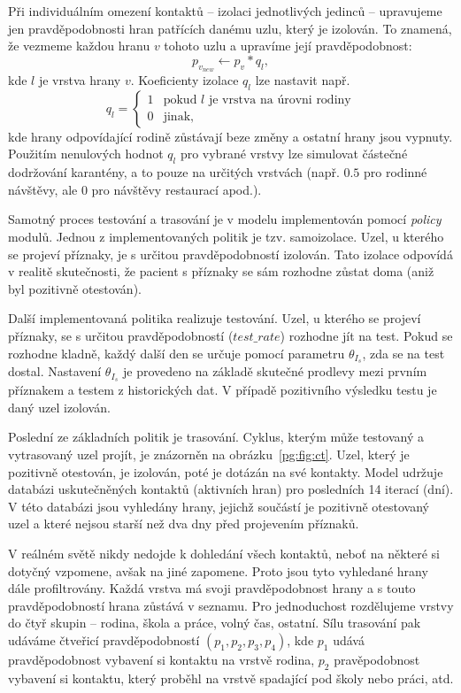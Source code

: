 Při individuálním omezení kontaktů -- izolaci jednotlivých jedinců -- upravujeme jen
pravděpodobnosti hran patřících danému uzlu, který je izolován. To znamená, že
vezmeme každou hranu $v$ tohoto uzlu a upravíme její pravděpodobnost:
$$
p_{v_{new}} \leftarrow p_{v} * q_l,
$$
kde  $l$  je vrstva hrany  $v$. 
Koeficienty izolace $q_l$ lze nastavit např.
$$
q_l =
\begin{cases}
  1  &  \mbox{pokud } l \mbox{ je vrstva na úrovni rodiny} \\
  0  &  \mbox{jinak,}
\end{cases}
$$
kde hrany odpovídající rodině zůstávají beze změny a ostatní hrany jsou vypnuty. Použitím nenulových hodnot $q_l$ pro vybrané vrstvy lze simulovat částečné dodržování karantény, a to pouze na určitých vrstvách (např. $0.5$ pro rodinné návštěvy, ale $0$ pro návštěvy restaurací apod.). 


Samotný proces testování a trasování je v modelu implementován pomocí {\em policy} modulů. Jednou z implementovaných politik je tzv. samoizolace. Uzel,
u kterého se projeví příznaky, je s určitou pravděpodobností izolován. Tato
izolace odpovídá v realitě skutečnosti, že pacient s příznaky se sám rozhodne
zůstat doma (aniž byl pozitivně otestován).

Další implementovaná politika realizuje testování. Uzel, u kterého se
projeví příznaky, se s určitou pravděpodobností ($test\_rate$)
rozhodne jít na test. Pokud se rozhodne kladně, každý další den se
určuje pomocí parametru $\theta_{I_s}$, zda se na test
dostal. Nastavení $\theta_{I_s}$ je provedeno na základě skutečné
prodlevy mezi prvním příznakem a testem z historických dat. V případě
pozitivního výsledku testu je daný uzel izolován.

Poslední ze základních politik je trasování. Cyklus, kterým může testovaný a
vytrasovaný uzel projít, je znázorněn na obrázku~\ref{pg:fig:ct}. Uzel, který je
pozitivně otestován, je izolován, poté je dotázán na své kontakty. Model udržuje
databázi uskutečněných kontaktů (aktivních hran) pro posledních 14 iterací (dní). V této databázi jsou vyhledány hrany, jejichž součástí je pozitivně
otestovaný uzel a které nejsou starší než dva dny před projevením příznaků.

V reálném světě nikdy nedojde k dohledání všech kontaktů, neboť na některé si dotyčný vzpomene, avšak na jiné zapomene. Proto jsou tyto vyhledané hrany dále
profiltrovány. Každá vrstva má svoji pravděpodobnost  hrany a s touto
pravděpodobností hrana zůstává v seznamu. Pro jednoduchost rozdělujeme vrstvy
do čtyř skupin -- rodina, škola a práce, volný čas, ostatní. Sílu trasování pak
udáváme čtveřicí pravděpodobností $(p_1, p_2, p_3, p_4)$, kde 
$p_1$ udává pravděpodobnost vybavení si kontaktu na vrstvě rodina, $p_2$
pravěpodobnost vybavení si kontaktu, který proběhl na vrstvě spadající pod školy
nebo práci, atd.


